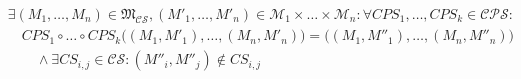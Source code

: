 \begin{align*}
    & \exists (M_1, \dots, M_n) \in \mathfrak{M}_{\mathcal{CS}}, (M'_1, \dots, M'_n) \in \mathcal{M}_1 \times \dots \times \mathcal{M}_n: \forall \mathit{CPS}_1, \ldots, \mathit{CPS}_k \in \mathcal{CPS} : \\
    & \hspace{1em} \mathit{CPS}_1 \circ \dots \circ \mathit{CPS}_k \big((M_1, M'_1), \dots, (M_n, M'_n) \big) = \big( (M_1, M''_1), \dots, (M_n, M''_n) \big)\\
    & \hspace{2em} \land \exists \mathit{CS}_{i,j} \in \mathcal{CS} : (M''_i, M''_j) \notin \mathit{CS}_{i,j}
\end{align*}

